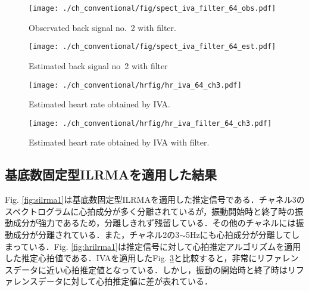 \begin{figure}[tb]
\centering
\texttt{[image: ./ch\_conventional/fig/spect\_iva\_filter\_64\_obs.pdf]}
\caption{Observated back signal no.~2 with filter.}
\label{fig:sfiva64obs}
\end{figure}

\begin{figure}[tb]
\centering
\texttt{[image: ./ch\_conventional/fig/spect\_iva\_filter\_64\_est.pdf]}
\caption{Estimated back signal no~2 with filter}
\label{fig:sfiva64est}
\end{figure}

\begin{figure}[htbp]
 \begin{minipage}{0.5\hsize}
  \begin{center}
   \texttt{[image: ./ch\_conventional/hrfig/hr\_iva\_64\_ch3.pdf]}
  \end{center}
  \caption{Estimated heart rate obtained by IVA.}
  \label{fig:hriva64ch3}
 \end{minipage}
 \begin{minipage}{0.5\hsize}
  \begin{center}
   \texttt{[image: ./ch\_conventional/hrfig/hr\_iva\_filter\_64\_ch3.pdf]}
  \end{center}
  \caption{Estimated heart rate obtained by IVA with filter.}
  \label{fig:fhriva64ch3}
 \end{minipage}
\end{figure}

\subsection{基底数固定型ILRMAを適用した結果}
\label{sec:conv:resultilrma1}
Fig. \ref{fig:silrma1}は基底数固定型ILRMAを適用した推定信号である．チャネル3のスペクトログラムに心拍成分が多く分離されているが，振動開始時と終了時の振動成分が強力であるため，分離しきれず残留している．その他のチャネルには振動成分が分離されている．また，チャネル2の3$\sim$5Hzにも心拍成分が分離してしまっている．Fig. \ref{fig:hrilrma1}は推定信号に対して心拍推定アルゴリズムを適用した推定心拍値である．IVAを適用したFig. \ref{fig:fhriva64ch3}と比較すると，非常にリファレンスデータに近い心拍推定値となっている．しかし，振動の開始時と終了時はリファレンスデータに対して心拍推定値に差が表れている．

